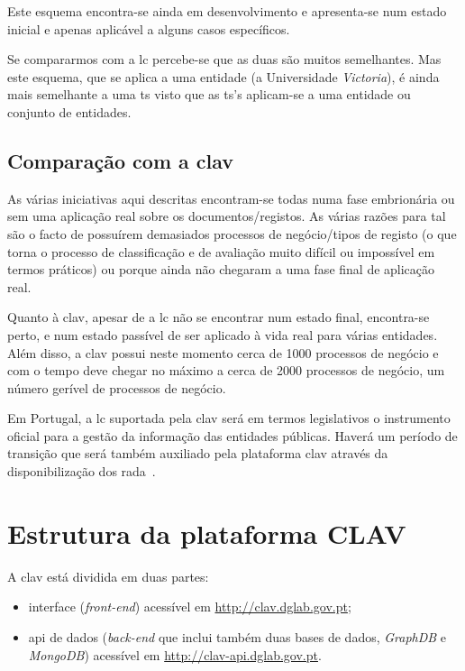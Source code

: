 Este esquema encontra-se ainda em desenvolvimento e apresenta-se num estado inicial e apenas aplicável a alguns 
casos específicos.

Se compararmos com a \acrshort{lc} percebe-se que as duas são muitos semelhantes. 
Mas este esquema, que se aplica a uma entidade (a Universidade \textit{Victoria}), é ainda mais semelhante a 
uma \acrshort{ts} visto que as \acrshort{ts}'s aplicam-se a uma entidade ou conjunto de entidades.

\subsection{Comparação com a \acrshort{clav}}

As várias iniciativas aqui descritas encontram-se todas numa fase embrionária ou sem uma aplicação real sobre os 
documentos/registos. As várias razões para tal são o facto de possuírem demasiados processos de negócio/tipos de 
registo (o que torna o processo de classificação e de avaliação muito difícil ou impossível em termos práticos) 
ou porque ainda não chegaram a uma fase final de aplicação real.

Quanto à \acrshort{clav}, apesar de a \acrshort{lc} não se encontrar num estado final, encontra-se perto, e num 
estado passível de ser aplicado à vida real para várias entidades. Além disso, a \acrshort{clav} possui neste 
momento cerca de 1000 processos de negócio e com o tempo deve chegar no máximo a cerca de 2000 processos de negócio, 
um número gerível de processos de negócio.

Em Portugal, a \acrshort{lc} suportada pela \acrshort{clav} será em termos legislativos o instrumento oficial 
para a gestão da informação das entidades públicas. Haverá um período de transição que será também auxiliado pela 
plataforma \acrshort{clav} através da disponibilização dos \acrshort{rada}~\cite{rada}.

\section{Estrutura da plataforma CLAV}
A \acrshort{clav} está dividida em duas partes:
\begin{itemize}
    \item interface (\textit{front-end}) acessível em \url{http://clav.dglab.gov.pt};
    \item \acrshort{api} de dados (\textit{back-end} que inclui também duas bases de dados, \textit{GraphDB} e 
    \textit{MongoDB}) acessível em \url{http://clav-api.dglab.gov.pt}.
\end{itemize}

